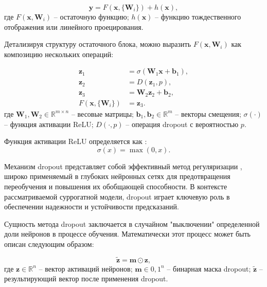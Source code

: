 \begin{equation*}
    \mathbf{y} = F(\mathbf{x}, \{\mathbf{W}_i\}) + h(\mathbf{x}),
\end{equation*}
где $F(\mathbf{x}, {\mathbf{W}_i})$ -- остаточную функцию;
$h(\mathbf{x})$ -- функцию тождественного отображения или линейного проецирования.

Детализируя структуру остаточного блока,
можно выразить $F(\mathbf{x}, {\mathbf{W}_i})$ как композицию нескольких операций:

\begin{equation*}
    \begin{split}
        \mathbf{z}_1                    & = \sigma(\mathbf{W}_1\mathbf{x} + \mathbf{b}_1), \\
        \mathbf{z}_2                    & = D(\mathbf{z}_1, p),                            \\
        \mathbf{z}_3                    & = \mathbf{W}_2\mathbf{z}_2 + \mathbf{b}_2,       \\
        F(\mathbf{x}, \{\mathbf{W}_i\}) & = \mathbf{z}_3.
    \end{split}
\end{equation*}
где $\mathbf{W}_1, \mathbf{W}_2 \in \mathbb{R}^{m \times n}$ -- весовые матрицы;
$\mathbf{b}_1, \mathbf{b}_2 \in \mathbb{R}^m$ -- векторы смещения;
$\sigma(\cdot)$ -- функция активации ReLU;
$D(\cdot, p)$ -- операция dropout с вероятностью $p$.

Функция активации ReLU определяется как \cite*{nair2010rectified}:
\begin{equation*}
    \sigma(x) = \max(0, x).
\end{equation*}

Механизм dropout представляет собой эффективный метод регуляризации \cite*{srivastava2014dropout},
широко применяемый в глубоких нейронных сетях для предотвращения переобучения
и повышения их обобщающей способности. В контексте рассматриваемой суррогатной
модели, dropout играет ключевую роль в обеспечении надежности
и устойчивости предсказаний.

Сущность метода dropout заключается в случайном "выключении" определенной
доли нейронов в процессе обучения. Математически этот процесс может быть описан
следующим образом:

\begin{equation*}
    \tilde{\mathbf{z}} = \mathbf{m} \odot \mathbf{z},
\end{equation*}
где $\mathbf{z} \in \mathbb{R}^n$ -- вектор активаций нейронов;
$\mathbf{m} \in {0, 1}^n$ -- бинарная маска dropout;
$\tilde{\mathbf{z}}$ -- результирующий вектор после применения dropout.

